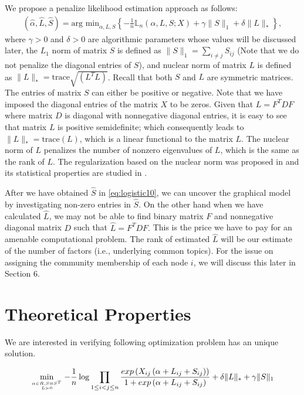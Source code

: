 \documentclass{article}
\begin{document}
We propose a penalize likelihood estimation approach as follows:
\begin{eqnarray}
\label{eq:logistic10}
(\hat{\alpha}, \hat{L}, \hat{S})
= \mbox{arg min}_{\alpha, L, S} \left\{
-\frac{1}{n} \mathbb{L}_n(\alpha,  L, S; X) + \gamma \|S\|_1
+ \delta \|L\|_\ast\right\},
\end{eqnarray}
where $\gamma>0$ and $\delta>0$ are algorithmic parameters whose values will be discussed later,
the $L_1$ norm of matrix $S$ is defined as $\|S\|_1 = \sum_{i\neq j} S_{ij}$ (Note that we do not penalize the diagonal entries of $S$), and nuclear norm of matrix $L$ is defined as $\|L\|_\ast = {\mbox{trace}\sqrt{(L^T L)}}$. Recall that both $S$ and $L$ are symmetric matrices. The entries of matrix $S$ can either be positive or negative. Note that we have imposed the diagonal entries of the matrix $X$ to be zeros. Given that $L = F^T D F$ where matrix $D$ is diagonal with nonnegative diagonal entries, it is easy to see that matrix $L$ is positive semidefinite; which consequently leads to $\|L\|_\ast = \mbox{trace}(L)$, which is a linear functional to the matrix $L$.
The nuclear norm of $L$ penalizes the number of nonzero eigenvalues of $L$, which is the same as the rank
of $L$.
The regularization based on the nuclear norm was proposed in \cite{fazel2001rank}
and its statistical properties are studied in \cite{bach2008consistency}.

After we have obtained $\hat{S}$ in \eqref{eq:logistic10}, we can uncover the graphical model by investigating non-zero entries in $\hat{S}$.
On the other hand when we have calculated $\hat{L}$, we may not be able to find binary matrix $F$ and nonnegative diagonal matrix $D$ such that $\hat{L} = F^T D F.$
This is the price we have to pay for an amenable computational problem. The rank of estimated $\hat{L}$ will be our estimate of the number of factors (i.e., underlying common topics). For the issue on assigning the community membership of each node $i$, we will discuss this later in Section 6.

\section{ Theoretical Properties }
We are interested in verifying following optimization problem has an unique solution.

\begin{align}
\min\limits_{\alpha \in R, S = S^T \atop L \succ 0}   
-\frac{1}{n} \log \prod_{1\le i< j\le n}\frac{exp\left(X_{ij}\left(\alpha+
L_{ij}+S_{ij}\right)\right)}{1+exp\left(\alpha+
L_{ij}+S_{ij}\right)} + \delta \|L\|_\ast + \gamma \|S\|_1
\end{align}
\end{document}
